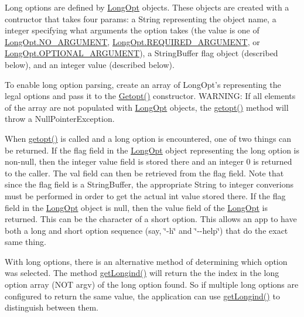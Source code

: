 Long options are defined by \hyperlink{classgnu_1_1getopt_1_1_long_opt}{LongOpt} objects. These objects are created with a contructor that takes four params: a String representing the object name, a integer specifying what arguments the option takes (the value is one of \hyperlink{classgnu_1_1getopt_1_1_long_opt_a5af856e8de6a5f528d4da2b8706f7abe}{LongOpt.NO\_\-ARGUMENT}, \hyperlink{classgnu_1_1getopt_1_1_long_opt_a8105c98436b46a0b4de39a3afab230c2}{LongOpt.REQUIRED\_\-ARGUMENT}, or \hyperlink{classgnu_1_1getopt_1_1_long_opt_a31819aae074fa1d80f547817640b31c1}{LongOpt.OPTIONAL\_\-ARGUMENT}), a StringBuffer flag object (described below), and an integer value (described below). 

To enable long option parsing, create an array of LongOpt's representing the legal options and pass it to the \hyperlink{classgnu_1_1getopt_1_1_getopt_a7babf5343414128369b45f7eb90882c1}{Getopt()} constructor. WARNING: If all elements of the array are not populated with \hyperlink{classgnu_1_1getopt_1_1_long_opt}{LongOpt} objects, the \hyperlink{classgnu_1_1getopt_1_1_getopt_a49e6fc6e18756f5dfaf85c1067325c3b}{getopt()} method will throw a NullPointerException. 

When \hyperlink{classgnu_1_1getopt_1_1_getopt_a49e6fc6e18756f5dfaf85c1067325c3b}{getopt()} is called and a long option is encountered, one of two things can be returned. If the flag field in the \hyperlink{classgnu_1_1getopt_1_1_long_opt}{LongOpt} object representing the long option is non-\/null, then the integer value field is stored there and an integer 0 is returned to the caller. The val field can then be retrieved from the flag field. Note that since the flag field is a StringBuffer, the appropriate String to integer converions must be performed in order to get the actual int value stored there. If the flag field in the \hyperlink{classgnu_1_1getopt_1_1_long_opt}{LongOpt} object is null, then the value field of the \hyperlink{classgnu_1_1getopt_1_1_long_opt}{LongOpt} is returned. This can be the character of a short option. This allows an app to have both a long and short option sequence (say, \char`\"{}-\/h\char`\"{} and \char`\"{}-\/-\/help\char`\"{}) that do the exact same thing. 

With long options, there is an alternative method of determining which option was selected. The method \hyperlink{classgnu_1_1getopt_1_1_getopt_abaf4fb9de230e1950d93abc1b9f86a8d}{getLongind()} will return the the index in the long option array (NOT argv) of the long option found. So if multiple long options are configured to return the same value, the application can use \hyperlink{classgnu_1_1getopt_1_1_getopt_abaf4fb9de230e1950d93abc1b9f86a8d}{getLongind()} to distinguish between them. 

